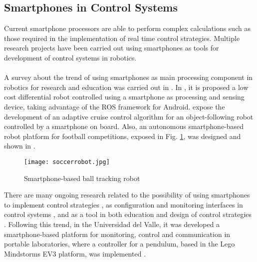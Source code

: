 \subsection{Smartphones in Control Systems}
Current smartphone processors are able to perform complex calculations such as those required in the implementation of real time control strategies. Multiple research projects have been carried out using smartphones as tools for development of control systems in robotics.
\\\\
A survey about the trend of using smartphones as main processing component in robotics for research and education was carried out in \cite{Oros2013a}.
In \cite{DeABarbosa2015}, it is proposed a low cost differential robot controlled using a smartphone as processing and sensing device, taking advantage of the ROS framework for Android. \cite{Gunawan2014} expose the development of an adaptive cruise control algorithm for an object-following robot controlled by a smartphone on board. Also, an autonomous smartphone-based robot platform for football competitions, exposed in Fig. \ref{fig:soccer}, was designed and shown in \cite{Tetzlaff2013}.
\begin{figure}[H]
\begin{center}
\texttt{[image: soccerrobot.jpg]}    
\caption[Smartphone-based ball tracking robot]{Smartphone-based ball tracking robot \protect\footnotemark} 
\label{fig:soccer}
\end{center}
\end{figure}
There are many ongoing research related to the possibility of using smartphones to implement control strategies \cite{Drumea2013a}, as configuration and monitoring interfaces in control systems \cite{Lin2014a,Truong2012a, Lu2017}, and as a tool in both education and design of control strategies \cite{Aristizabal2014a,WuWu2013a}. Following this trend, in the Universidad del Valle, it was developed a smartphone-based platform for monitoring, control and communication in portable laboratories, where a controller for a pendulum, based in the Lego Mindstorms EV3 platform, was implemented \cite {GarciaTellez2015}.

